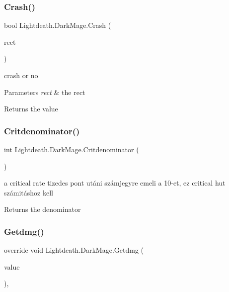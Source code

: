 \subsubsection{\texorpdfstring{Crash()}{Crash()}}
{\footnotesize\ttfamily bool Lightdeath.\+Dark\+Mage.\+Crash (\begin{DoxyParamCaption}\item[{Rect}]{rect }\end{DoxyParamCaption})\hspace{0.3cm}{\ttfamily [inline]}}



crash or no 


\begin{DoxyParams}{Parameters}
{\em rect} & the rect\\
\hline
\end{DoxyParams}
\begin{DoxyReturn}{Returns}
the value
\end{DoxyReturn}
\hypertarget{class_lightdeath_1_1_dark_mage_aca7462b02bbaed30f2c972e8f5ed36ff}{}\label{class_lightdeath_1_1_dark_mage_aca7462b02bbaed30f2c972e8f5ed36ff} 
\subsubsection{\texorpdfstring{Critdenominator()}{Critdenominator()}}
{\footnotesize\ttfamily int Lightdeath.\+Dark\+Mage.\+Critdenominator (\begin{DoxyParamCaption}{ }\end{DoxyParamCaption})\hspace{0.3cm}{\ttfamily [inline]}}



a critical rate tizedes pont utáni számjegyre emeli a 10-\/et, ez critical hut számitáshoz kell 

\begin{DoxyReturn}{Returns}
the denominator
\end{DoxyReturn}
\hypertarget{class_lightdeath_1_1_dark_mage_a01e8b2ecfc7c649f384efe5b416507c1}{}\label{class_lightdeath_1_1_dark_mage_a01e8b2ecfc7c649f384efe5b416507c1} 
\subsubsection{\texorpdfstring{Getdmg()}{Getdmg()}}
{\footnotesize\ttfamily override void Lightdeath.\+Dark\+Mage.\+Getdmg (\begin{DoxyParamCaption}\item[{int}]{value }\end{DoxyParamCaption})\hspace{0.3cm}{\ttfamily [inline]}, {\ttfamily [virtual]}}



